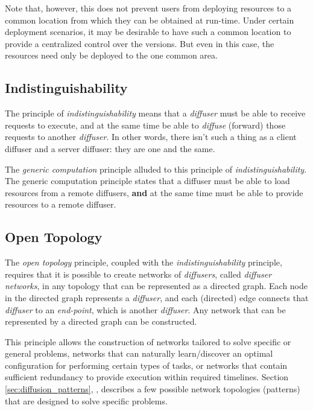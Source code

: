 \documentclass[11pt]{scrartcl}
\begin{document}
Note that, however, this does not prevent users from deploying resources to a common location from which they can be obtained at run-time. Under certain deployment scenarios, it may be desirable to have such a common location to provide a centralized control over the versions. But even in this case, the resources need only be deployed to the one common area.

\subsection{Indistinguishability\label{sec:indistinguishability}}
The principle of \emph{indistinguishability} means that a \emph{diffuser} must be able to receive requests to execute, and at the same time be able to \emph{diffuse} (forward) those requests to another \emph{diffuser}. In other words, there isn't such a thing as a client diffuser and a server diffuser: they are one and the same.

The \emph{generic computation} principle alluded to this principle of \emph{indistinguishability}. The generic computation principle states that a diffuser must be able to load resources from a remote diffusers, \textbf{and} at the same time must be able to provide resources to a remote diffuser.

\subsection{Open Topology\label{sec:open_topoloogy}}
The \emph{open topology} principle, coupled with the \emph{indistinguishability} principle, requires that it is possible to create networks of \emph{diffusers}, called \emph{diffuser networks}, in any topology that can be represented as a directed graph. Each node in the directed graph represents a \emph{diffuser}, and each (directed) edge connects that \emph{diffuser} to an \emph{end-point}, which is another \emph{diffuser}. Any network that can be represented by a directed graph can be constructed. 

This principle allows the construction of networks tailored to solve specific or general problems, networks that can naturally learn/discover an optimal configuration for performing certain types of tasks, or networks that contain sufficient redundancy to provide execution within required timelines. Section \ref{sec:diffusion_patterns}, \emph{}, describes a few possible network topologies (patterns) that are designed to solve specific problems.
\end{document}

